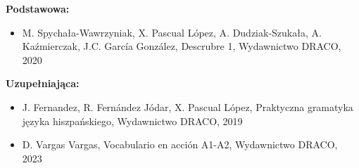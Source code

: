 \documentclass[12pt, a4paper]{article}
\begin{document}
\textbf{Podstawowa:}
\begin{itemize}
  \item M. Spychała-Wawrzyniak, X. Pascual López, A. Dudziak-Szukała, A. Kaźmierczak, J.C. García González, Descrubre 1, Wydawnictwo DRACO, 2020
\end{itemize}

\textbf{Uzupełniająca:}
\begin{itemize}
  \item J. Fernandez, R. Fernández Jódar, X. Pascual López, Praktyczna gramatyka języka hiszpańskiego, Wydawnictwo DRACO, 2019
  \item D. Vargas Vargas, Vocabulario en acción A1-A2, Wydawnictwo DRACO, 2023
\end{itemize}
\end{document}
